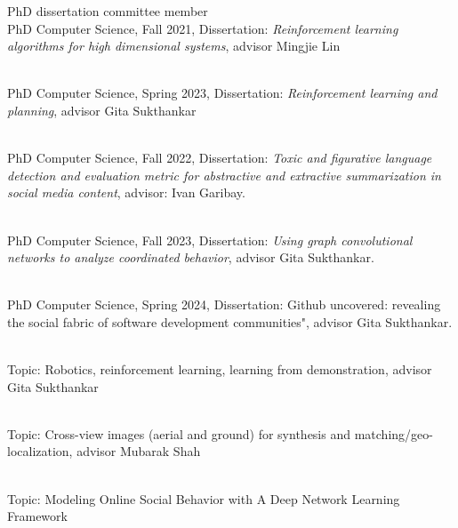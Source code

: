 \begin{category}{PhD dissertation committee member}
 \\
PhD Computer Science, Fall 2021, Dissertation: {\em Reinforcement learning algorithms for high dimensional systems}, advisor Mingjie Lin

 \\
PhD Computer Science, Spring 2023, Dissertation: {\em Reinforcement learning and planning}, advisor Gita Sukthankar

 \\
PhD Computer Science, Fall 2022, Dissertation: {\em Toxic and figurative language detection and evaluation metric for abstractive and extractive summarization in social media content}, advisor: Ivan Garibay.

 \\
PhD Computer Science, Fall 2023, Dissertation: {\em Using graph convolutional networks to analyze coordinated behavior}, advisor Gita Sukthankar.

 \\
PhD Computer Science, Spring 2024, Dissertation: Github uncovered: revealing the social fabric of software development communities", advisor Gita Sukthankar.

%
%



 \\
Topic: Robotics, reinforcement learning, learning from demonstration, advisor Gita Sukthankar

 \\
Topic: Cross-view images (aerial and ground) for synthesis and matching/geo-localization, advisor Mubarak Shah

 \\
Topic: Modeling Online Social Behavior with A Deep Network Learning Framework


\end{category}
